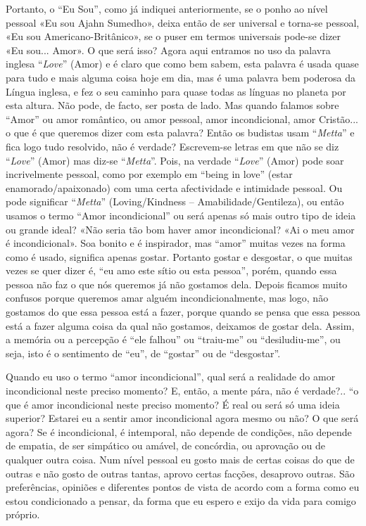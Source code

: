 Portanto, o ``Eu Sou'', como já indiquei anteriormente, se o ponho ao
nível pessoal «Eu sou Ajahn Sumedho», deixa então de ser universal e
torna-se pessoal, «Eu sou Americano-Britânico», se o puser em termos
universais pode-se dizer «Eu sou... Amor». O que será isso? Agora aqui
entramos no uso da palavra inglesa ``\emph{Love}'' (Amor) e é claro que
como bem sabem, esta palavra é usada quase para tudo e mais alguma coisa
hoje em dia, mas é uma palavra bem poderosa da Língua inglesa, e fez o
seu caminho para quase todas as línguas no planeta por esta altura. Não
pode, de facto, ser posta de lado. Mas quando falamos sobre ``Amor'' ou
amor romântico, ou amor pessoal, amor incondicional, amor Cristão... o
que é que queremos dizer com esta palavra? Então os budistas usam
``\emph{Metta}'' e fica logo tudo resolvido, não é verdade? Escrevem-se
letras em que não se diz ``\emph{Love}'' (Amor) mas diz-se
``\emph{Metta}''. Pois, na verdade ``\emph{Love}'' (Amor) pode soar
incrivelmente pessoal, como por exemplo em ``being in love'' (estar
enamorado/apaixonado) com uma certa afectividade e intimidade pessoal.
Ou pode significar ``\emph{Metta}'' (Loving/Kindness --
Amabilidade/Gentileza), ou então usamos o termo ``Amor incondicional''
ou será apenas só mais outro tipo de ideia ou grande ideal? «Não seria
tão bom haver amor incondicional? «Ai o meu amor é incondicional». Soa
bonito e é inspirador, mas ``amor'' muitas vezes na forma como é usado,
significa apenas gostar. Portanto gostar e desgostar, o que muitas vezes
se quer dizer é, ``eu amo este sítio ou esta pessoa'', porém, quando
essa pessoa não faz o que nós queremos já não gostamos dela. Depois
ficamos muito confusos porque queremos amar alguém incondicionalmente,
mas logo, não gostamos do que essa pessoa está a fazer, porque quando se
pensa que essa pessoa está a fazer alguma coisa da qual não gostamos,
deixamos de gostar dela. Assim, a memória ou a percepção é ``ele
falhou'' ou ``traiu-me'' ou ``desiludiu-me'', ou seja, isto é o
sentimento de ``eu'', de ``gostar'' ou de ``desgostar''.

Quando eu uso o termo ``amor incondicional'', qual será a realidade do
amor incondicional neste preciso momento? E, então, a mente pára, não é
verdade?.. ``o que é amor incondicional neste preciso momento? É real ou
será só uma ideia superior? Estarei eu a sentir amor incondicional agora
mesmo ou não? O que será agora? Se é incondicional, é intemporal, não
depende de condições, não depende de empatia, de ser simpático ou
amável, de concórdia, ou aprovação ou de qualquer outra coisa. Num nível
pessoal eu gosto mais de certas coisas do que de outras e não gosto de
outras tantas, aprovo certas facções, desaprovo outras. São
preferências, opiniões e diferentes pontos de vista de acordo com a
forma como eu estou condicionado a pensar, da forma que eu espero e
exijo da vida para comigo próprio.

